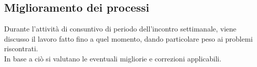 \documentclass[a4paper, 12pt]{article}
\begin{document}
\subsection{Miglioramento dei processi}
Durante l'attività di consuntivo di periodo dell’incontro settimanale, viene discusso il lavoro
fatto fino a quel momento, dando particolare peso ai problemi riscontrati. \\In base a ciò si valutano
le eventuali migliorie e correzioni applicabili.
\end{document}
